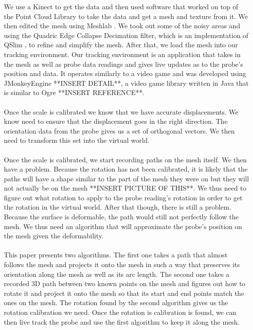 \documentclass[conference]{acmsiggraph}
\begin{document}
We use a Kinect to get the data and then used software that worked on top of the Point Cloud Library \cite{pointcloudlibrary} to take the data and get a mesh and texture from it. We then edited the mesh using Meshlab \cite{meshlab}. We took out some of the noisy areas and using the Quadric Edge Collapse Decimation filter, which is an implementation of QSlim \cite{qslim}, to refine and simplify the mesh. After that, we load the mesh into our tracking environment. Our tracking environment is an application that takes in the mesh as well as probe data readings and gives live updates as to the probe's position and data. It operates similarly to a video game and was developed using JMonkeyEngine **INSERT DETAIL**, a video game library written in Java that is similar to Ogre **INSERT REFERENCE**. \\
\\
Once the scale is calibrated we know that we have accurate displacements. We know need to ensure that the displacement goes in the right direction. The orientation data from the probe gives us a set of orthogonal vectors. We then need to transform this set into the virtual world.\\
\\
Once the scale is calibrated, we start recording paths on the mesh itself. We then have a problem. Because the rotation has not been calibrated, it is likely that the paths will have a shape similar to the part of the mesh they were on but they will not actually be on the mesh **INSERT PICTURE OF THIS**. We thus need to figure out what rotation to apply to the probe reading's rotation in order to get the rotation in the virtual world. After that though, there is still a problem. Because the surface is deformable, the path would still not perfectly follow the mesh. We thus need an algorithm that will approximate the probe's position on the mesh given the deformability. \\
\\
This paper presents two algorithms. The first one takes a path that almost follows the mesh and projects it onto the mesh in such a way that preserves its orientation along the mesh as well as its arc length. The second one takes a recorded 3D path between two known points on the mesh and figures out how to rotate it and project it onto the mesh so that its start and end points match the ones on the mesh. The rotation found by the second algorithm gives us the rotation calibration we need. Once the rotation is calibration is found, we can then live track the probe and use the first algorithm to keep it along the mesh. 
\end{document}
